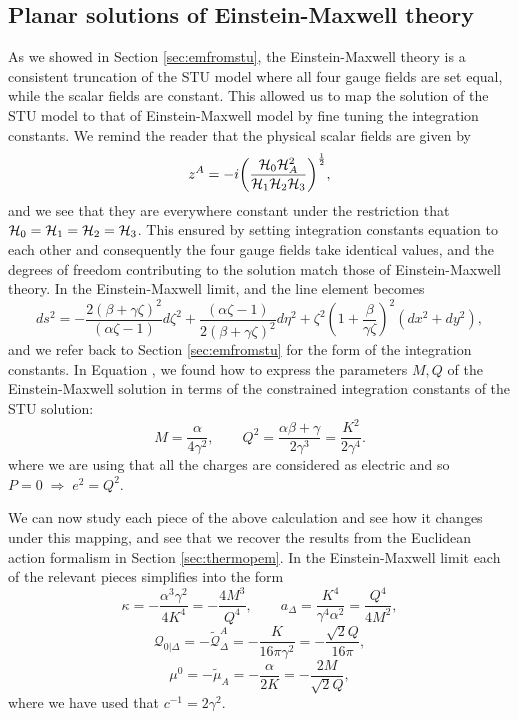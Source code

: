 \subsection{Planar solutions of Einstein-Maxwell theory}


As we showed in Section \ref{sec:emfromstu}, the Einstein-Maxwell theory is a consistent truncation of the STU model where all four gauge fields are set equal, while the scalar fields are constant. This allowed us to map the solution of the STU model to that of Einstein-Maxwell model by fine tuning the integration constants. We remind the reader that the physical scalar fields  are given by
\begin{equation*}
    z^A = - i \bigg(\frac{{\cal H}_0 {\cal H}_A^2}{{\cal H}_1 {\cal H}_2 {\cal H}_3} \bigg)^{\frac{1}{2}},
\end{equation*}
and we see that they are everywhere constant under the restriction that ${\cal H}_0 = {\cal H}_1 = {\cal H}_2 = {\cal H}_3$. This ensured by setting integration constants equation to each other and consequently the four gauge fields take identical values, and the degrees of freedom contributing to the solution match those of Einstein-Maxwell theory. In the Einstein-Maxwell limit, and the line element becomes
\begin{equation*}
    ds^2 = -\frac{2(\beta + \gamma \zeta)^2}{(\alpha \zeta - 1)} d\zeta^2 + \frac{(\alpha \zeta - 1)}{2(\beta + \gamma \zeta)^2} d\eta^2 + \zeta^2 \left(1 + \frac{\beta}{\gamma \zeta} \right)^2 (dx^2 + dy^2),
\end{equation*}
and we refer back to Section \ref{sec:emfromstu} for the form of the integration constants. In Equation , we found how to express the parameters $M,Q$ of the Einstein-Maxwell solution in terms of the constrained integration constants of the STU solution:
\begin{equation*}
    M = \frac{\alpha}{4 \gamma^2}, \qquad Q^2 = \frac{\alpha \beta + \gamma }{2\gamma^3} = \frac{K^2}{2 \gamma^4}.
\end{equation*}
where we are using that all the charges are considered as electric and so $P = 0 \; \Rightarrow \; e^2 = Q^2$.

We can now study each piece of the above calculation and see how it changes under this mapping, and see that we recover the results from the Euclidean action formalism in Section \ref{sec:thermopem}. In the Einstein-Maxwell limit each of the relevant pieces simplifies into the form
\begin{equation*}
    \kappa = - \frac{\alpha^3 \gamma^2}{4 K^4} = - \frac{4 M^3}{Q^4}, \qquad a_\Delta  = \frac{K^4}{\gamma^4 \alpha^2} = \frac{Q^4}{4 M^2},
\end{equation*}
\begin{equation*}
        \mathcal{Q}_{0|\Delta} = - \tilde{\mathcal{Q}}^A_\Delta = - \frac{K}{16 \pi \gamma^2} = - \frac{\sqrt{2} Q}{16 \pi},
\end{equation*}        
\begin{equation*}
     \mu^0 = - \tilde{\mu}_A = -\frac{\alpha}{2 K} = - \frac{2 M}{\sqrt{2} Q},
\end{equation*}
where we have used that $c^{-1} = 2\gamma^2$.

